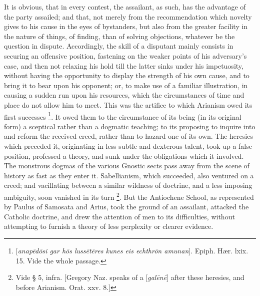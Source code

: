 It is obvious, that in every contest, the assailant, as such, has
the advantage of the party assailed; and that, not merely from the
recommendation which novelty gives to his cause in the eyes of
bystanders, but also from the greater facility in the nature of
things, of finding, than of solving objections, whatever be the
question in dispute. Accordingly, the skill of a disputant mainly
consists in securing an offensive position, fastening on the weaker
points of his adversary's case, and then not relaxing his hold till
the latter sinks under his impetuosity, without having the opportunity
to display the strength of his own cause, and to bring it to bear upon
his opponent; or, to make use of a familiar illustration, in causing a
sudden run upon his resources, which the circumstances of time and
place do not allow him to meet. This was the artifice to which
Arianism owed its first successes \footnote{[\emph{anap\={e}d\={o}si gar h\={o}s luss\={e}t\={e}res
kunes eis echthr\={o}n amunan}]. Epiph. Hær. lxix. 15. Vide the
whole passage.}. It owed them to the
circumstance of its being (in its original form) a sceptical rather
than a dogmatic teaching; to its proposing to inquire into and
reform the received creed, rather than to hazard one of its own. The
heresies which preceded it, originating in less subtle and dexterous
talent, took up a false position, professed a theory, and sunk under
the obligations which it involved. The monstrous dogmas of the various
Gnostic sects pass away from the scene of history as fast as they
enter it. Sabellianism, which succeeded, also ventured on a creed; and
vacillating between a similar wildness of doctrine, and a less
imposing ambiguity, soon vanished in its turn \footnote{Vide § 5, infra. [Gregory Naz. speaks of a
[\emph{gal\={e}n\={e}}] after these heresies, and before
Arianism. Orat. xxv. 8.]}. But the
Antiochene School, as represented by Paulus of Samosata and Arius,
took the ground of an assailant, attacked the Catholic doctrine, and
drew the attention of men to its difficulties, without attempting to
furnish a theory of less perplexity or clearer evidence.

